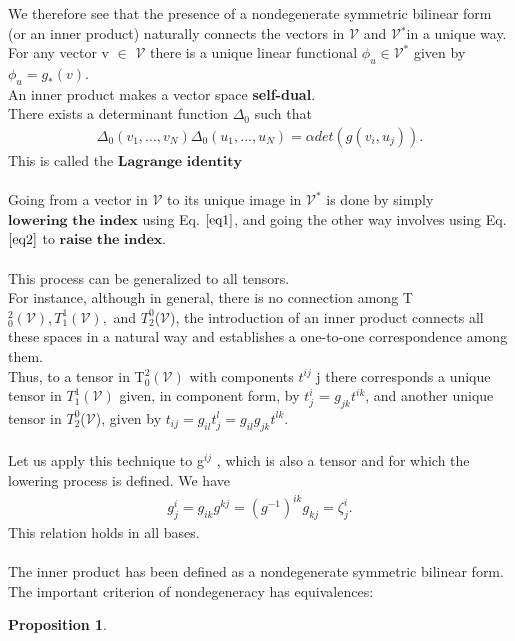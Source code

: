 \documentclass[12pt,a4paper]{article}
\newtheorem{prop}{Proposition}
\begin{document}
We therefore see that the presence of a nondegenerate symmetric bilinear
form (or an inner product) naturally connects the vectors in $\mathcal{V}$ and $\mathcal{V}$$^*$in a
unique way. \\For any vector v $\in$ $\mathcal{V}$ there is a unique linear functional $\phi_u \in \mathcal{V}^*$
given by $\phi_u = g_*(v)$. \\An inner product
makes a vector space \textbf{self-dual}. \\There exists a determinant function $\Delta_0$ such that
\begin{align*}
\Delta_0 (v_1, ... , v_N) \Delta_0 ( u_1, ..., u_N) = \alpha det(g(v_i, u_j)).
\end{align*}
This is called the $\textbf{Lagrange identity}$\\
\\
Going from a vector in $\mathcal{V}$ to its unique image in $\mathcal{V}^*$ is done by simply $\textbf{lowering the index}$ using Eq. $\ref{eq1}$, and going the other way involves using Eq. $\ref{eq2}$ to $\textbf{raise the index}$.\\
\\
This process can be generalized to all tensors. \\For instance, although in general, there is no connection among T$^2_0(\mathcal{V}), T^1_1(\mathcal{V}),$ and $T_2^0$($\mathcal{V}$), the introduction of an inner product connects all
these spaces in a natural way and establishes a one-to-one correspondence
among them. \\Thus, to a tensor in T$^2_0(\mathcal{V})$ with components $t^{ij}$ j there corresponds a unique tensor in $T^1_1(\mathcal{V})$ given, in component form, by $t_j^i$ = $g_{jk}t^{ik}$, and another unique tensor in $T_2^0$($\mathcal{V}$), given by $t_{ij} = g_{il} t^l_j = g_{il} g_{jk} t^{lk}$.\\\\
Let us apply this technique to g$^{ij}$ , which is also a tensor and for which
the lowering process is defined. We have
\begin{align*}
g^i_j = g_{ik}g^{kj} = (g^{-1})^{ik} g_{kj} = \zeta_j^i.
\end{align*}
This relation holds in all bases.\\
\\
The inner product has been defined as a nondegenerate symmetric bilinear form. \\The important criterion of nondegeneracy has equivalences:
\begin{prop} \label{propdeg}

\end{prop}$$
\end{document}
